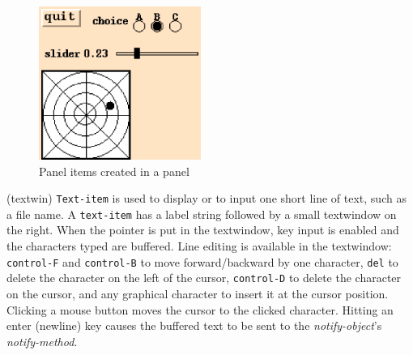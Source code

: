 \begin{figure}
\begin{center}
\includegraphics[height=5cm]{fig/panelitem.ps}
\end{center}
\caption{Panel items created in a panel\label{panelitem}}
\end{figure}


\begin{refdesc}
{(textwin)}{
{\tt Text-item} is used to display or to input one short line of text,
such as a file name.
A {\tt text-item} has a label string followed by
a small textwindow on the right.
When the pointer is put in the textwindow, key input is enabled
and the characters typed are buffered.
Line editing is available in the textwindow: 
{\tt control-F} and {\tt control-B} to move forward/backward by one character,
{\tt del} to delete the character on the left of the cursor,
{\tt control-D} to delete the character on the cursor, and
any graphical character to insert it at the cursor position.
Clicking a mouse button moves the cursor to the clicked character.
Hitting an enter (newline) key causes the buffered text to be sent to
the {\em notify-object}'s {\em notify-method}.}




\end{refdesc}

